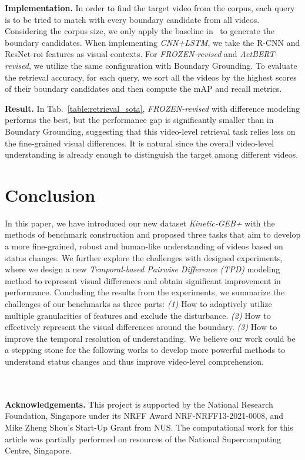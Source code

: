 \documentclass[runningheads]{llncs}
\begin{document}
\textbf{Implementation.}
In order to find the target video from the corpus, each query is to be tried to match with every boundary candidate from all videos. Considering the corpus size, we only apply the baseline in~\cite{shou2021generic} to generate the boundary candidates. When implementing \textit{CNN+LSTM}, we take the R-CNN and ResNet-roi features as visual contexts. For \textit{FROZEN-revised} and \textit{ActBERT-revised}, we utilize the same configuration with Boundary Grounding. To evaluate the retrieval accuracy, for each query, we sort all the videos by the highest scores of their boundary candidates and then compute the mAP and recall metrics.


\textbf{Result.}
In Tab.~\ref{table:retrieval_sota}, \textit{FROZEN-revised} with difference modeling performs the best, but the performance gap is significantly smaller than in Boundary Grounding, suggesting that this video-level retrieval task relies less on the fine-grained visual differences. It is natural since the overall video-level understanding is already enough to distinguish the target among different videos. 


 \section{Conclusion}
\label{conclusion}
In this paper, we have introduced our new dataset \textit{Kinetic-GEB+} with the methods of benchmark construction and proposed three tasks that aim to develop a more fine-grained, robust and human-like understanding of videos based on status changes. We further explore the challenges with designed experiments, where we design a new \textit{Temporal-based Pairwise Difference (TPD)} modeling method to represent visual differences and obtain significant improvement in performance. 
Concluding the results from the experiments, we summarize the challenges of our benchmarks as three parts: \textit{(1)} How to adaptively utilize multiple granularities of features and exclude the disturbance. \textit{(2)} How to effectively represent the visual differences around the boundary. \textit{(3)} How to improve the temporal resolution of understanding. 
We believe our work could be a stepping stone for the following works to develop more powerful methods to understand status changes and thus improve video-level comprehension. 

 
~\\~\\
\noindent
\textbf{Acknowledgements.} This project is supported by the National Research Foundation, Singapore under its NRFF Award NRF-NRFF13-2021-0008, and Mike Zheng Shou's Start-Up Grant from NUS. The computational work for this article was partially performed on resources of the National Supercomputing Centre, Singapore.
\end{document}
